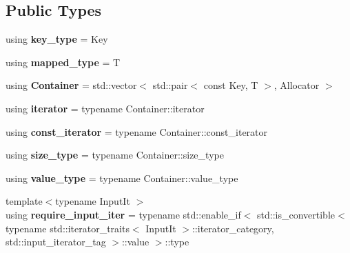 \subsection*{Public Types}
\begin{DoxyCompactItemize}
\item 
\mbox{\label{structnlohmann_1_1ordered__map_a57095c6ed403f02e1bc2c240a13c9ed8}} 
using {\bfseries key\+\_\+type} = Key
\item 
\mbox{\label{structnlohmann_1_1ordered__map_a1c9c1509ee714a9814b45a8030c84ec7}} 
using {\bfseries mapped\+\_\+type} = T
\item 
\mbox{\label{structnlohmann_1_1ordered__map_a0cabe346c38a4f1ab1b8a396fbd2bbe2}} 
using {\bfseries Container} = std\+::vector$<$ std\+::pair$<$ const Key, T $>$, Allocator $>$
\item 
\mbox{\label{structnlohmann_1_1ordered__map_aef8bc179883da4194bc6b657b87eeb07}} 
using {\bfseries iterator} = typename Container\+::iterator
\item 
\mbox{\label{structnlohmann_1_1ordered__map_a8276ac13f6e6ad27594a7e287a5ea071}} 
using {\bfseries const\+\_\+iterator} = typename Container\+::const\+\_\+iterator
\item 
\mbox{\label{structnlohmann_1_1ordered__map_ab5044ef3fc07cf7aee67241c4d10ce9d}} 
using {\bfseries size\+\_\+type} = typename Container\+::size\+\_\+type
\item 
\mbox{\label{structnlohmann_1_1ordered__map_abe9b97ae84d9c40616913b50b2778150}} 
using {\bfseries value\+\_\+type} = typename Container\+::value\+\_\+type
\item 
\mbox{\label{structnlohmann_1_1ordered__map_a89cc338e8466e74baaa138664c79ee98}} 
{\footnotesize template$<$typename Input\+It $>$ }\\using {\bfseries require\+\_\+input\+\_\+iter} = typename std\+::enable\+\_\+if$<$ std\+::is\+\_\+convertible$<$ typename std\+::iterator\+\_\+traits$<$ Input\+It $>$\+::iterator\+\_\+category, std\+::input\+\_\+iterator\+\_\+tag $>$\+::value $>$\+::type
\end{DoxyCompactItemize}

